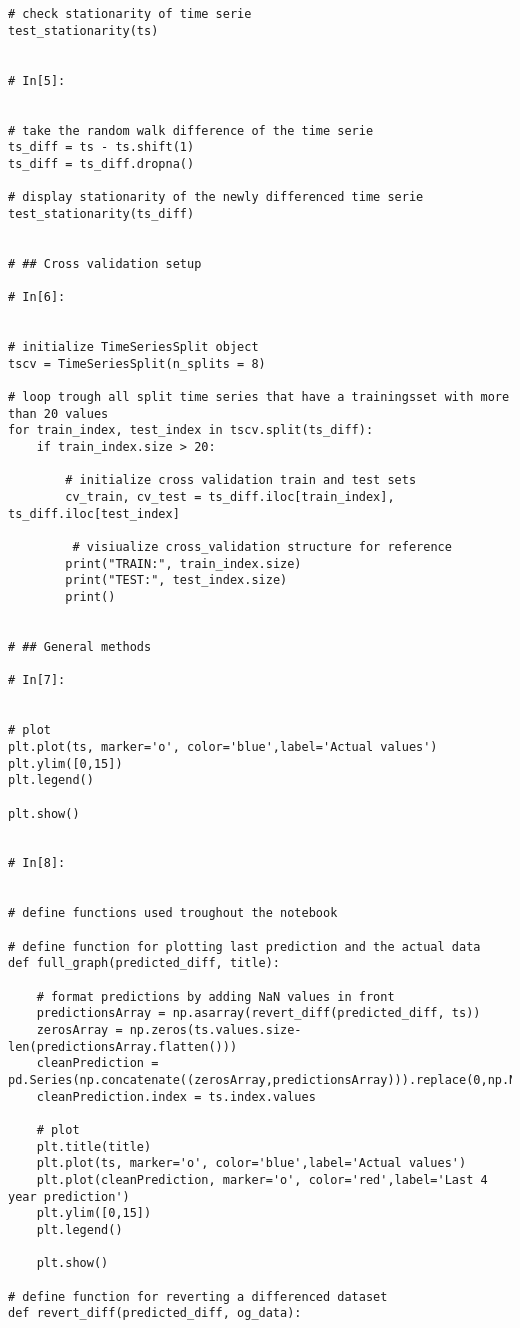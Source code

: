 \begin{verbatim}
# check stationarity of time serie
test_stationarity(ts)


# In[5]:


# take the random walk difference of the time serie
ts_diff = ts - ts.shift(1)
ts_diff = ts_diff.dropna()

# display stationarity of the newly differenced time serie
test_stationarity(ts_diff)


# ## Cross validation setup

# In[6]:


# initialize TimeSeriesSplit object
tscv = TimeSeriesSplit(n_splits = 8)

# loop trough all split time series that have a trainingsset with more than 20 values
for train_index, test_index in tscv.split(ts_diff):
    if train_index.size > 20:

        # initialize cross validation train and test sets
        cv_train, cv_test = ts_diff.iloc[train_index], ts_diff.iloc[test_index]
        
         # visiualize cross_validation structure for reference
        print("TRAIN:", train_index.size)
        print("TEST:", test_index.size)
        print()


# ## General methods

# In[7]:


# plot
plt.plot(ts, marker='o', color='blue',label='Actual values')
plt.ylim([0,15])
plt.legend()

plt.show()


# In[8]:


# define functions used troughout the notebook

# define function for plotting last prediction and the actual data
def full_graph(predicted_diff, title):
    
    # format predictions by adding NaN values in front
    predictionsArray = np.asarray(revert_diff(predicted_diff, ts))
    zerosArray = np.zeros(ts.values.size-len(predictionsArray.flatten()))
    cleanPrediction = pd.Series(np.concatenate((zerosArray,predictionsArray))).replace(0,np.NaN)
    cleanPrediction.index = ts.index.values
    
    # plot
    plt.title(title)
    plt.plot(ts, marker='o', color='blue',label='Actual values')
    plt.plot(cleanPrediction, marker='o', color='red',label='Last 4 year prediction')
    plt.ylim([0,15])
    plt.legend()

    plt.show()

# define function for reverting a differenced dataset
def revert_diff(predicted_diff, og_data):
    

\end{verbatim}
